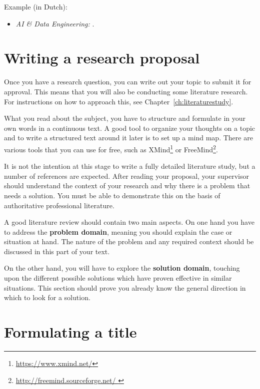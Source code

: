 Example (in Dutch):

\begin{itemize}
	\item \emph{AI \& Data Engineering:}  \autocite{Cluyse2023}.
\end{itemize}

\section{Writing a research proposal}
\label{sec:researchproposal}

Once you have a research question, you can write out your topic to submit it for approval. This means that you will also be conducting some literature research. For instructions on how to approach this, see Chapter~\ref{ch:literaturestudy}.

What you read about the subject, you have to structure and formulate in your own words in a continuous text. A good tool to organize your thoughts on a topic and to write a structured text around it later is to set up a mind map. There are various tools that you can use for free, such as XMind\footnote{\url{https://www.xmind.net/}} or FreeMind\footnote{\url{http://freemind.sourceforge.net/ }}.


It is not the intention at this stage to write a fully detailed literature study, but a number of references are expected. After reading your proposal, your supervisor should understand the context of your research and why there is a problem that needs a solution. You must be able to demonstrate this on the basis of authoritative professional literature.

A good literature review should contain two main aspects. On one hand you have to address the \textbf{problem domain}, meaning you should explain the case or situation at hand. The nature of the problem and any required context should be discussed in this part of your text.

On the other hand, you will have to explore the \textbf{solution domain}, touching upon the different possible solutions which have proven effective in similar situations.  This section should prove you already know the general direction in which to look for a solution.

\section{Formulating a title}
\label{sec:formulating_a_title}

